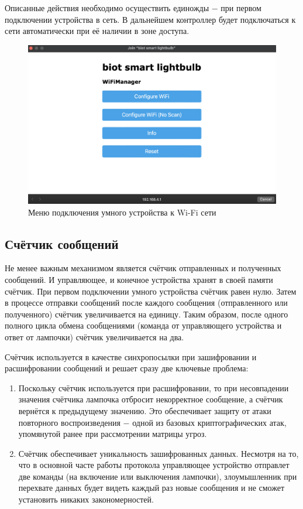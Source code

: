 	Описанные действия необходимо осуществить единожды $-$ при первом подключении устройства в сеть.
	В дальнейшем контроллер будет подключаться к сети автоматически при её наличии в зоне доступа.
	
	\begin{figure}[H]
		\centering
		\includegraphics[scale=0.5]{resources/wifi-manager-1}
		\caption{Меню подключения умного устройства к Wi-Fi сети}
		\label{fig4.4}
	\end{figure}
	
	\subsection{Счётчик сообщений}
	
	Не менее важным механизмом является счётчик отправленных и полученных сообщений. И управляющее,
	и конечное устройства хранят в своей памяти счётчик. При первом подключении умного устройства
	счётчик равен нулю. Затем в процессе отправки сообщений после каждого сообщения (отправленного
	или полученного) счётчик увеличивается на единицу. Таким образом, после одного полного цикла
	обмена сообщениями (команда от управляющего устройства и ответ от лампочки) счётчик увеличивается
	на два.
	
	Счётчик используется в качестве синхропосылки при зашифровании и расшифровании сообщений и решает
	сразу две ключевые проблема:
	
	\begin{enumerate}
		\item Поскольку счётчик используется при расшифровании, то при несовпадении значения счётчика 
		лампочка отбросит некорректное сообщение, а счётчик вернётся к предыдущему значению. Это обеспечивает 
		защиту от атаки повторного воспроизведения $-$ одной из базовых криптографических атак, упомянутой ранее 
		при рассмотрении матрицы угроз.
		\item Счётчик обеспечивает уникальность зашифрованных данных. Несмотря на то, что в основной часте
		работы протокола управляющее устройство отправлет две команды (на включение или выключения лампочки),
		злоумышленник при перехвате данных будет видеть каждый раз новые сообщения и не сможет установить
		никаких закономерностей.
	\end{enumerate}
	
